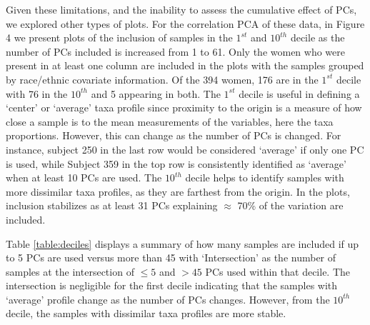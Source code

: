 \documentclass[doublespacing]{bmcart}
\def\texttt{[image: ]}
\begin{document}
Given these limitations, and the inability to assess the cumulative effect of PCs, we explored other types of plots. For the correlation PCA of these data, in Figure 4 we present plots of the inclusion of samples in the $1^{st}$ and $10^{th}$ decile as the number of PCs included is increased from 1 to 61.  Only the women who were present in at least one column are included in the plots with the samples grouped by race/ethnic covariate information. Of the 394 women, 176 are in the $1^{st}$ decile with 76 in the $10^{th}$ and 5 appearing in both. The $1^{st}$ decile is useful in defining a `center' or `average' taxa profile since proximity to the origin is a measure of how close a sample is to the mean measurements of the variables, here the taxa proportions. However, this can change as the number of PCs is changed. For instance, subject 250 in the last row would be considered `average' if only one PC is used, while Subject 359 in the top row is consistently identified as `average' when at least 10 PCs are used.  The $10^{th}$ decile helps to identify samples with more dissimilar taxa profiles, as they are farthest from the origin. In the plots, inclusion stabilizes as at least 31 PCs explaining $\approx$ 70\% of the variation are included. 

Table \ref{table:deciles} displays a summary of how many samples are included if up to 5 PCs are used versus more than 45 with `Intersection' as the number of samples at the intersection of $\leq 5$ and $>45$ PCs used within that decile. The intersection is negligible for the first decile indicating that the samples with `average' profile change as the number of PCs changes. However, from the $10^{th}$ decile, the samples with dissimilar taxa profiles are more stable.



\end{document}
